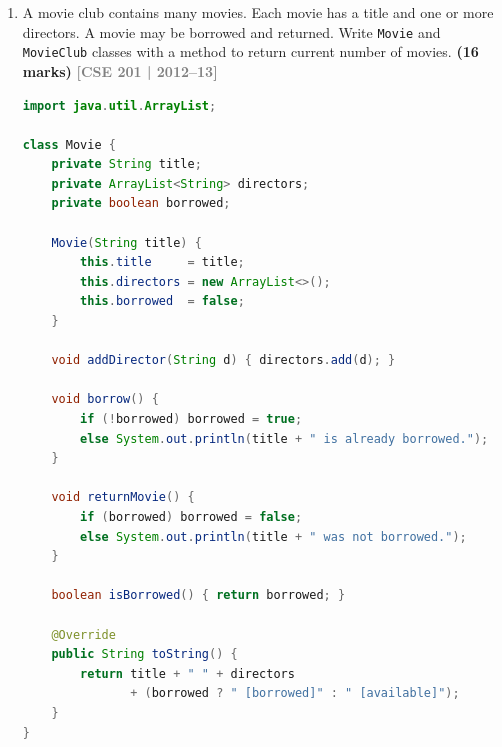\documentclass[12pt,a3paper]{article}
\newcommand{\yr}[1]{\hfill\textcolor{gray}{\small\textbf{[#1]}}}
\newcommand{\mk}[1]{\textcolor{orange!70!black}{\small\textbf{(#1 marks)}}}
\begin{document}
\begin{enumerate}
\begin{tcolorbox}[enhanced,breakable,ansbox,
  colback=cC!4,colframe=cC,boxrule=0.8pt,arc=5pt,
  title={\textbf{Answer --- Animal Class with ArrayList}},
  fonttitle=\bfseries\color{white},colbacktitle=cC]
\begin{lstlisting}[language=Java]
        System.out.println("Before: " + list);

        Iterator<Animal> it = list.iterator();
        while (it.hasNext())
            if (it.next().getName().equals("Lion")) it.remove();

        System.out.println("After:  " + list);
    }
}
\end{lstlisting}
\textbf{Output:}
\begin{verbatim}
Before: [Animal{name=Lion, age=5}, Animal{name=Tiger, age=3}, ...]
After:  [Animal{name=Tiger, age=3}, Animal{name=Parrot, age=2}]
\end{verbatim}
\end{tcolorbox}

\item A movie club contains many movies. Each movie has a title and one or more directors. A movie may be borrowed and returned. Write \texttt{Movie} and \texttt{MovieClub} classes with a method to return current number of movies. \mk{16}
\yr{CSE 201 | 2012--13}

\begin{tcolorbox}[enhanced,breakable,ansbox,
  colback=cC!4,colframe=cC,boxrule=0.8pt,arc=5pt,
  title={\textbf{Answer --- Movie and MovieClub Classes}},
  fonttitle=\bfseries\color{white},colbacktitle=cC]
\begin{lstlisting}[language=Java]
import java.util.ArrayList;

class Movie {
    private String title;
    private ArrayList<String> directors;
    private boolean borrowed;

    Movie(String title) {
        this.title     = title;
        this.directors = new ArrayList<>();
        this.borrowed  = false;
    }

    void addDirector(String d) { directors.add(d); }

    void borrow() {
        if (!borrowed) borrowed = true;
        else System.out.println(title + " is already borrowed.");
    }

    void returnMovie() {
        if (borrowed) borrowed = false;
        else System.out.println(title + " was not borrowed.");
    }

    boolean isBorrowed() { return borrowed; }

    @Override
    public String toString() {
        return title + " " + directors
               + (borrowed ? " [borrowed]" : " [available]");
    }
}


\end{lstlisting}
\end{tcolorbox}
\end{enumerate}
\end{document}
